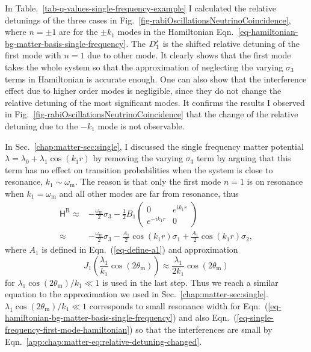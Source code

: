 In Table.~\ref{tab-q-values-single-frequency-example} I calculated the relative detunings of the three cases in Fig.~\ref{fig-rabiOscillationsNeutrinoCoincidence}, where $n=\pm 1$ are for the $\pm k_1$ modes in the Hamiltonian Eqn.~\ref{eq-hamiltonian-bg-matter-basis-single-frequency}. The $D'_1$ is the shifted relative detuning of the first mode with $n=1$ due to other mode. It clearly shows that the first mode takes the whole system so that the approximation of neglecting the varying $\sigma_3$ terms in Hamiltonian is accurate enough. One can also show that the interference effect due to higher order modes is negligible, since they do not change the relative detuning of the most significant modes. It confirms the results I observed in Fig.~\ref{fig-rabiOscillationsNeutrinoCoincidence} that the change of the relative detuning due to the $-k_1$ mode is not observable.

In Sec.~\ref{chap:matter-sec:single}, I discussed the single frequency matter potential $\lambda = \lambda_0 + \lambda_1 \cos(k_1 r)$ by removing the varying $\sigma_3$ term by arguing that this term has no effect on transition probabilities when the system is close to resonance, $k_1 \sim \omega_{\mathrm m}$. The reason is that only the first mode $n=1$ is on resonance when $k_1=\omega_{\mathrm m}$ and all other modes are far from resonance, thus
\begin{align}
\mathsf H^{\mathrm R} \approx & -\frac{\omega_{\mathrm m}}{2}\sigma_3 - \frac{1}{2} B_1 \begin{pmatrix}
0 & e^{i k_1 r} \\
e^{-ik_1r} & 0
\end{pmatrix}\label{eq-single-frequency-first-mode-hamiltonian} \\
\approx & -\frac{\omega_{\mathrm m}}{2} \sigma_3 - \frac{A_1}{2} \cos(k_1 r) \sigma_1 + \frac{A_1}{2} \cos(k_1 r) \sigma_2\nonumber,
\end{align}
where $A_1$ is defined in Eqn.~(\ref{eq-define-a1}) and approximation
\begin{equation*}
J_1\left( \frac{\lambda_1}{k_1}\cos (2\theta_{\mathrm m}) \right) \approx \frac{\lambda_1}{2k_1}\cos (2\theta_{\mathrm m})
\end{equation*}
for $\lambda_1\cos(2\theta_{\mathrm m})/k_1\ll 1$ is used in the last step. Thus we reach a similar equation to the approximation we used in Sec.~\ref{chap:matter-sec:single}. $\lambda_1\cos(2\theta_{\mathrm m})/k_1\ll 1$ corresponds to small resonance width for Eqn.~(\ref{eq-hamiltonian-bg-matter-basis-single-frequency}) and also Eqn.~(\ref{eq-single-frequency-first-mode-hamiltonian}) so that the interferences are small by Eqn.~\ref{app:chap:matter-eq:relative-detuning-changed}.


